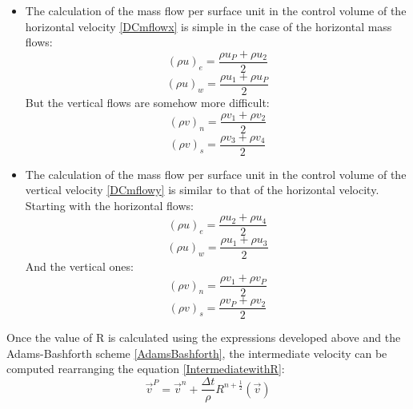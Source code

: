 \begin{itemize}
	\item The calculation of the mass flow per surface unit in the control volume of the horizontal velocity \ref{DCmflowx} is simple in the case of the horizontal mass flows:
	\begin{equation}
	\left(\rho u\right)_{e}=\frac{\rho u_{P}+\rho u_{2}}{2}
	\end{equation}
	\begin{equation}
	\left(\rho u\right)_{w}=\frac{\rho u_{1}+\rho u_{P}}{2}
	\end{equation}
	But the vertical flows are somehow more difficult:
	\begin{equation}
	\left(\rho v\right)_{n}=\frac{\rho v_{1}+\rho v_{2}}{2}
	\end{equation}
	\begin{equation}
	\left(\rho v\right)_{s}=\frac{\rho v_{3}+\rho v_{4}}{2}
	\end{equation}
	\item The calculation of the mass flow per surface unit in the control volume of the vertical velocity \ref{DCmflowy} is similar to that of the horizontal velocity. Starting with the horizontal flows:
	\begin{equation}
	\left(\rho u\right)_{e}=\frac{\rho u_{2}+\rho u_{4}}{2}
	\end{equation}
	\begin{equation}
	\left(\rho u\right)_{w}=\frac{\rho u_{1}+\rho u_{3}}{2}
	\end{equation}
	And the vertical ones:
	\begin{equation}
	\left(\rho v\right)_{n}=\frac{\rho v_{1}+\rho v_{P}}{2}
	\end{equation}
	\begin{equation}
	\left(\rho v\right)_{s}=\frac{\rho v_{P}+\rho v_{2}}{2}
	\end{equation}
\end{itemize}
Once the value of R is calculated using the expressions developed above and the Adams-Bashforth scheme \ref{AdamsBashforth}, the intermediate velocity can be computed rearranging the equation \ref{IntermediatewithR}:
\begin{equation}
\vec{v}^{P}=\vec{v}^{n}+\frac{\Delta t}{\rho}R^{n+\frac{1}{2}}\left(\vec{v}\right)
\end{equation}

